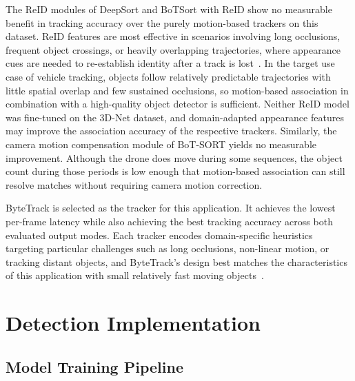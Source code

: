 \documentclass[12pt,oneside,bibtotoc,liststotoc]{scrbook}
\begin{document}
The ReID modules of DeepSort and BoTSort with ReID show no measurable benefit in tracking accuracy
over the purely motion-based trackers on this dataset. ReID features are most effective in scenarios
involving long occlusions, frequent object crossings, or heavily overlapping trajectories, where
appearance cues are needed to re-establish identity after a track is lost~\cite{advzemovic2025deepLearningMultiObjectTrackingSurvey}.
In the target use case of vehicle tracking, objects follow relatively predictable trajectories
with little spatial overlap and few sustained occlusions, so motion-based association in
combination with a high-quality object detector is sufficient.
Neither ReID model was fine-tuned on the 3D-Net dataset, and domain-adapted appearance features
may improve the association accuracy of the respective trackers. Similarly, the camera motion compensation
module of BoT-SORT yields no measurable improvement.
Although the drone does move during some sequences, the object count during those periods is low
enough that motion-based association can still resolve matches without requiring camera motion
correction.

ByteTrack is selected as the tracker for this application. It achieves the lowest per-frame latency
while also achieving the best tracking accuracy across both evaluated output modes. Each tracker
encodes domain-specific heuristics targeting particular challenges such as long occlusions,
non-linear motion, or tracking distant objects, and ByteTrack's design best matches the
characteristics of this application with small relatively fast moving objects~\cite{advzemovic2025deepLearningMultiObjectTrackingSurvey}.

\newpage
\chapter{Detection Implementation}
\label{chap:implementation}

\vspace{-1em}
\section{Model Training Pipeline}
\label{sec:model_training_pipeline}
\end{document}
